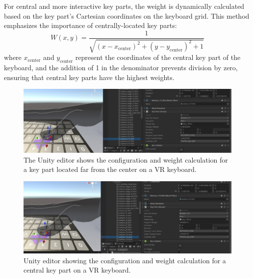 \noindent
For central and more interactive key parts, the weight is dynamically calculated based on the key part's Cartesian coordinates on the keyboard grid. This method emphasizes the importance of centrally-located key parts:
\begin{equation}
W(x, y) = \frac{1}{\sqrt{(x - x_{\text{center}})^2 + (y - y_{\text{center}})^2 + 1}}
\end{equation}
where $x_{\text{center}}$ and $y_{\text{center}}$ represent the coordinates of the central key part of the keyboard, and the addition of 1 in the denominator prevents division by zero, ensuring that central key parts have the highest weights.
\begin{figure}[h!]
    \centering
    \includegraphics[width=\linewidth]{Development/Key_part_near_to_the_center.PNG}
    \caption{\centering The Unity editor shows the configuration and weight calculation for a key part located far from the center on a VR keyboard.}
\end{figure}

\begin{figure}[h!]
    \centering
    \includegraphics[width=\linewidth]{Development/Capture_more_near_to_the_center.PNG}
    \caption{\centering Unity editor showing the configuration and weight calculation for a central key part on a VR keyboard.}
\end{figure}



